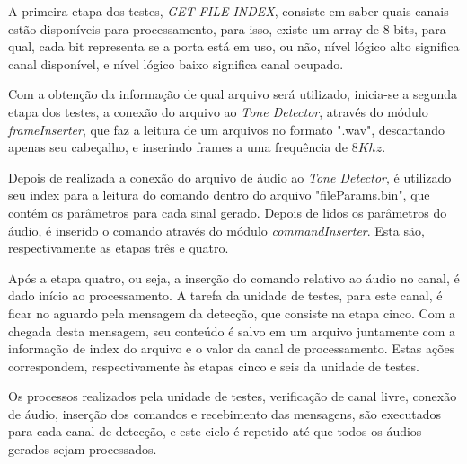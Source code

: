 \documentclass[monografia]{subfiles}
\begin{document}
			A primeira etapa dos testes, \textit{GET FILE INDEX}, consiste em saber quais canais estão disponíveis para processamento, para isso, existe um
			array de 8 bits, para qual, cada bit representa se a porta está em uso, ou não, nível lógico alto significa canal disponível, e nível
			lógico baixo significa canal ocupado.
			
			Com a obtenção da informação de qual arquivo será utilizado, inicia-se a segunda etapa dos testes, a conexão do arquivo ao 
			\textit{Tone Detector}, através do módulo \textit{frameInserter}, que faz a leitura de um arquivos no formato ".wav", descartando apenas seu
			cabeçalho, e inserindo frames a uma frequência de $8Khz$.

			Depois de realizada a conexão do arquivo de áudio ao \textit{Tone Detector}, é utilizado seu index para a leitura do comando dentro do arquivo 
			"fileParams.bin", que contém os parâmetros para cada sinal gerado. Depois de lidos os parâmetros do áudio, é inserido o comando através do módulo
			\textit{commandInserter}. Esta são, respectivamente as etapas três e quatro.

			Após a etapa quatro, ou seja, a inserção do comando relativo ao áudio no canal, é dado início ao processamento. A tarefa da unidade de testes, para este
			canal, é ficar no aguardo pela mensagem da detecção, que consiste na etapa cinco. Com a chegada desta mensagem, seu conteúdo é salvo em um arquivo
			juntamente com a informação de index do arquivo e o valor da canal de processamento. Estas ações correspondem, respectivamente às etapas cinco e 
			seis da
			unidade de testes.

			Os processos realizados pela unidade de testes, verificação de canal livre, conexão de áudio, inserção dos comandos e recebimento das mensagens,
			são executados para cada canal de	detecção, e este ciclo é repetido até que todos os áudios gerados sejam processados.
\end{document}
